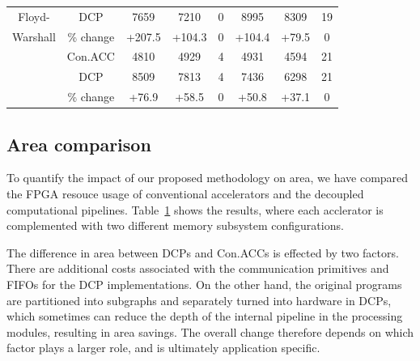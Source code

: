 \begin{table}[htbp]
\begin{tabular}{| c | c | c | c | c | c | c | c| }
Floyd- &DCP       & 7659 &7210 &0  &8995  &8309 &19 \\
\cline{2-8}                                                                                                             
 Warshall      &\% change &+207.5  &+104.3 & 0 & +104.4  & +79.5  & 0  \\
  \hline                                                                                                           
\multirow{3}{*}{}&Con.ACC  & 4810 &4929 &4 & 4931 & 4594 & 21  \\
\cline{2-8}                                                                                                                                                    
DFS &DCP       & 8509 & 7813& 4 & 7436  &6298 & 21\\
\cline{2-8}                                                                                                             
       &\% change & +76.9 &+58.5 & 0 & +50.8  & +37.1 & 0  \\
  \hline                                                                                                           

\end{tabular}
\label{tab:areacom}
\end{table}







\subsection{Area comparison}
To quantify the impact of our proposed methodology on area, 
we have compared the FPGA resouce usage of conventional accelerators and
the decoupled computational pipelines.
Table~\ref{tab:areacom} shows the results, 
where each acclerator is complemented with two different memory subsystem configurations.

The difference in area between DCPs and Con.ACCs is effected by
two factors.  There are additional costs associated with the communication primitives 
and FIFOs for the DCP implementations. 
On the other hand,   
the original programs are partitioned into subgraphs and separately turned into hardware
in DCPs, which sometimes can reduce the depth of the internal 
pipeline in the processing modules, resulting in area savings. 
The overall change therefore depends on which factor plays a larger role, and is 
ultimately application specific. 


